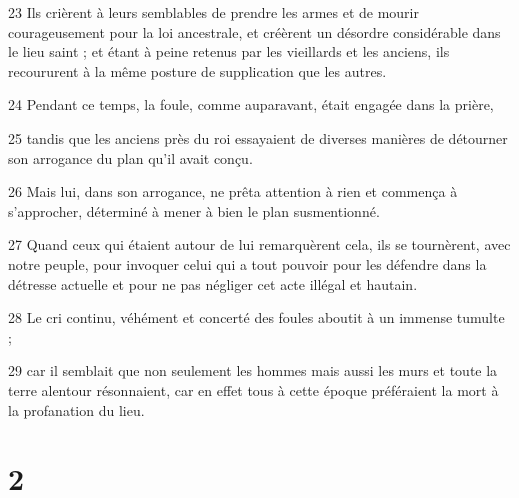 \par 23 Ils crièrent à leurs semblables de prendre les armes et de mourir courageusement pour la loi ancestrale, et créèrent un désordre considérable dans le lieu saint ; et étant à peine retenus par les vieillards et les anciens, ils recoururent à la même posture de supplication que les autres.
\par 24 Pendant ce temps, la foule, comme auparavant, était engagée dans la prière,
\par 25 tandis que les anciens près du roi essayaient de diverses manières de détourner son arrogance du plan qu'il avait conçu.
\par 26 Mais lui, dans son arrogance, ne prêta attention à rien et commença à s'approcher, déterminé à mener à bien le plan susmentionné.
\par 27 Quand ceux qui étaient autour de lui remarquèrent cela, ils se tournèrent, avec notre peuple, pour invoquer celui qui a tout pouvoir pour les défendre dans la détresse actuelle et pour ne pas négliger cet acte illégal et hautain.
\par 28 Le cri continu, véhément et concerté des foules aboutit à un immense tumulte ; 
\par 29 car il semblait que non seulement les hommes mais aussi les murs et toute la terre alentour résonnaient, car en effet tous à cette époque préféraient la mort à la profanation du lieu.

\chapter{2}

